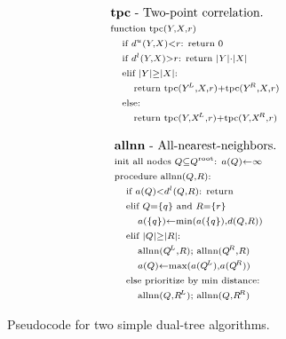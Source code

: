 \documentclass{article}
\newcommand{\disthrectmin}{d^{l}}
\newcommand{\disthrectmax}{d^{u}}
\newcommand{\dist}[2]{d(#1,#2)}
\newcommand{\kdroot}[1]{#1^{\text{\rm root}}}
\newcommand{\kdleft}[1]{#1^{\!L}}
\newcommand{\kdright}[1]{#1^{\!R}}
\newcommand{\X}{\\ \scriptstyle}
\newcommand{\x}{\\ \hspace{0.13in} \scriptstyle}
\newcommand{\xx}{\\ \hspace{0.26in} \scriptstyle}
\begin{document}
\begin{figure}
  \vspace{-1.89in}
  \hspace{1.8in}
  \begin{minipage}{3.88in}
    \begin{minipage}{1.8in}
      \begin{displaymath}
        \begin{array}{l}
          \text{{\bf tpc} - Two-point correlation.}
          \X \text{function tpc}(Y, X, r)
          \x \text{if }\disthrectmax(Y, X) < r\text{: return }0
          \x \text{if }\disthrectmin(Y, X) > r\text{: return } |Y| \cdot |X|
          \x \text{elif }|Y| \geq |X|\text{:}
          \xx \text{return tpc}(\kdleft{Y}, X, r) + \text{tpc}(\kdright{Y}, X, r)
          \x \text{else:}
          \xx \text{return tpc}(Y, \kdleft{X}, r) + \text{tpc}(Y, \kdright{X}, r)
        \end{array}
       \end{displaymath}
       \vspace{-.11in}
       \caption{\label{fig:allnntpc}\footnotesize Pseudocode for two simple dual-tree algorithms.}
      \end{minipage}
      \begin{minipage}{2.0in}
       \begin{displaymath}
        \begin{array}{l}
          \text{{\bf allnn} - All-nearest-neighbors.}
          \X \text{init all nodes }Q \subseteq \kdroot{Q}\text{: }a(Q) \gets \infty
          \X \text{procedure allnn}(Q,R)\text{:}
          \x \text{if }a(Q) < \disthrectmin(Q, R)\text{: return}
          \x \text{elif }Q = \{q\} \text{ and } R = \{r\}
          \xx a(\{q\}) \gets \min(a(\{q\}), \dist{Q}{R})
          \x \text{elif }|Q| \geq |R|\text{:}
          \xx \text{allnn}(\kdleft{Q}, R); \text{ allnn}(\kdright{Q}, R)
          \xx a(Q) \gets \max(a(\kdleft{Q}), a(\kdright{Q}))
          \x \text{else prioritize by min distance:}
          \xx \text{allnn}(Q, \kdleft{R}); \text{ allnn}(Q, \kdright{R})
          \\
        \end{array}
       \end{displaymath}
      \end{minipage}

\end{minipage}
\end{figure}
\end{document}
